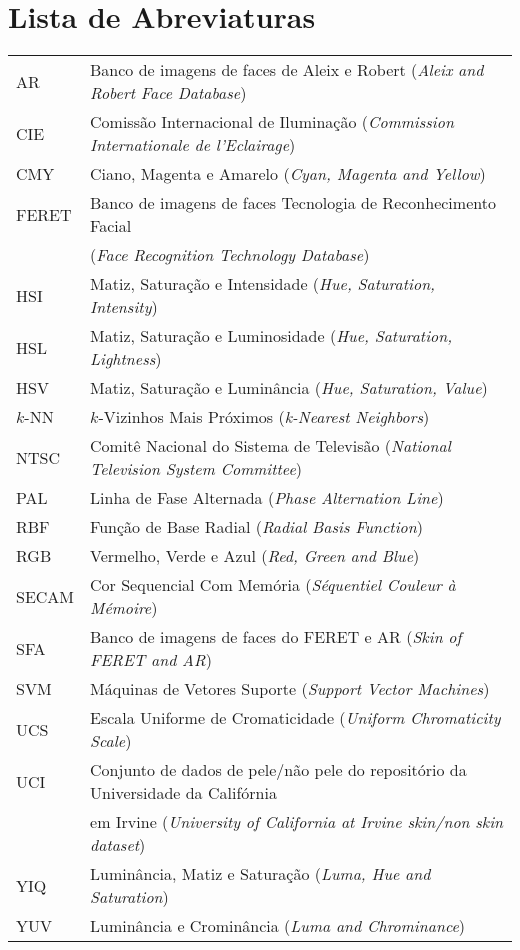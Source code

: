 \documentclass[11pt,twoside,a4paper]{book}
\theoremstyle{plain}
\theoremstyle{definition}
\begin{document}
\chapter{Lista de Abreviaturas}
\begin{tabular}{ll}
    AR          & Banco de imagens de faces de Aleix e Robert (\emph{Aleix and Robert Face Database})\\
    CIE         & Comissão Internacional de Iluminação (\emph{Commission Internationale de l'Eclairage})\\
    CMY         & Ciano, Magenta e Amarelo (\emph{Cyan, Magenta and Yellow})\\
    FERET       & Banco de imagens de faces Tecnologia de Reconhecimento Facial\\                 & (\emph{Face Recognition Technology Database})\\
    HSI         & Matiz, Saturação e Intensidade (\emph{Hue, Saturation, Intensity})\\
    HSL         & Matiz, Saturação e Luminosidade (\emph{Hue, Saturation, Lightness})\\
    HSV         & Matiz, Saturação e Luminância (\emph{Hue, Saturation, Value})\\
    $k$-NN        & $k$-Vizinhos Mais Próximos (\emph{k-Nearest Neighbors})\\
    NTSC        & Comitê Nacional do Sistema de Televisão (\emph{National Television System Committee})\\
    PAL         & Linha de Fase Alternada (\emph{Phase Alternation Line})\\
    RBF         & Função de Base Radial (\emph{Radial Basis Function})\\
    RGB         & Vermelho, Verde e Azul (\emph{Red, Green and Blue})\\
    SECAM       & Cor Sequencial Com Memória (\emph{Séquentiel Couleur à Mémoire})\\
    SFA         & Banco de imagens de faces do FERET e AR (\emph{Skin of FERET and AR})\\
    SVM         & Máquinas de Vetores Suporte (\emph{Support Vector Machines})\\
    UCS         & Escala Uniforme de Cromaticidade (\emph{Uniform Chromaticity Scale})\\
    UCI         & Conjunto de dados de pele/não pele do repositório da Universidade da Califórnia\\
                & em Irvine (\emph{University of California at Irvine skin/non skin dataset})\\
    YIQ         & Luminância, Matiz e Saturação (\emph{Luma, Hue and Saturation})\\
    YUV         & Luminância e Crominância (\emph{Luma and Chrominance})\\
\end{tabular}
\end{document}
